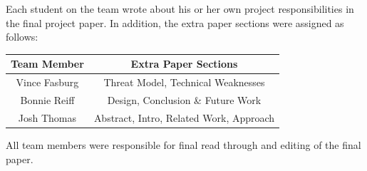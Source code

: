 \documentclass[pagenumbers]{ieee}
\begin{document}
Each student on the team wrote about his or her own project responsibilities in the final project paper. In addition, the extra paper sections were assigned as follows:

\begin{center}
	\begin{tabular}{ | c | c | }
		\hline \textbf{Team Member} & \textbf{Extra Paper Sections} \\ \hline
		Vince Fasburg & Threat Model, Technical Weaknesses \\ \hline
		Bonnie Reiff &  Design, Conclusion \& Future Work \\ \hline
		Josh Thomas & Abstract, Intro, Related Work, Approach  \\ \hline
	\end{tabular}
\end{center}

 All team members were responsible for final read through and editing of the final paper.


\newpage



\end{document}
